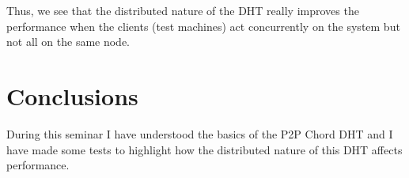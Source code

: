 \documentclass[a4paper, 11pt]{article}
\begin{document}
Thus, we see that the distributed nature of the DHT really improves the performance when the clients (test machines) act concurrently on the system but not all on the same node.

\section{Conclusions}

During this seminar I have understood the basics of the P2P Chord DHT and I have made some tests to highlight how the distributed nature of this DHT affects performance.
\end{document}
